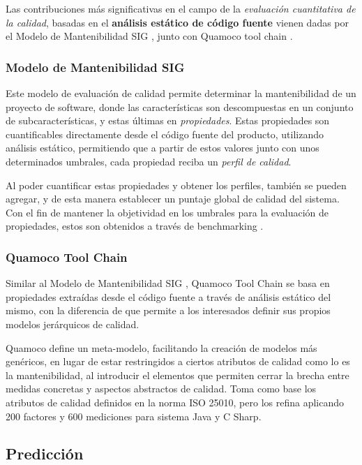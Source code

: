 Las contribuciones más significativas en el campo de la \textit{evaluación cuantitativa de la calidad},
basadas en el \textbf{análisis estático de código fuente} vienen dadas por el Modelo de Mantenibilidad 
SIG \cite{Heitlager2007}, junto con Quamoco tool chain \cite{Wagner2012}.

\subsubsection{Modelo de Mantenibilidad SIG}

Este modelo de evaluación de calidad \cite{Heitlager2007} permite determinar la mantenibilidad
de un proyecto de software, donde las características son descompuestas en un
conjunto de subcaracterísticas, y estas últimas en \textit{propiedades}.
Estas propiedades son cuantificables directamente desde el código fuente del producto, utilizando
análisis estático, permitiendo que a partir de estos valores junto con unos determinados umbrales,
cada propiedad reciba un \textit{perfil de calidad}.

Al poder cuantificar estas propiedades y obtener los perfiles, también se pueden agregar,
y de esta manera establecer un puntaje global de calidad del sistema.
Con el fin de mantener la objetividad en los umbrales para la evaluación de propiedades,
estos son obtenidos a través de benchmarking \cite{Alves2010}.

\subsubsection{Quamoco Tool Chain}

Similar al Modelo de Mantenibilidad SIG \cite{Heitlager2007}, Quamoco Tool Chain \cite{Wagner2012}
se basa en propiedades extraídas desde el código fuente a través de análisis estático del mismo,
con la diferencia de que permite a los interesados definir sus propios modelos jerárquicos
de calidad.

Quamoco define un meta-modelo, facilitando la creación de modelos más genéricos, en lugar de
estar restringidos a ciertos atributos de calidad como lo es la mantenibilidad, al introducir
el elementos que permiten cerrar la brecha entre medidas concretas y aspectos abstractos de
calidad.
Toma como base los atributos de calidad definidos en la norma ISO 25010, pero los refina
aplicando 200 factores y 600 mediciones para sistema Java y C Sharp.

\subsection{Predicción}

